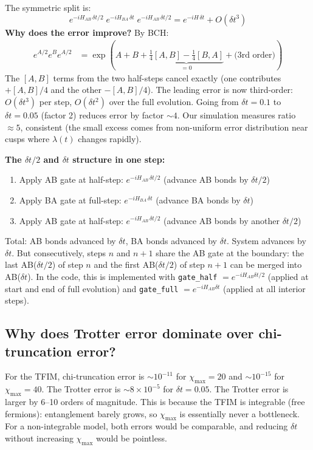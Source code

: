\documentclass[11pt, a4paper]{article}
\begin{document}
The symmetric split is:
\begin{equation}
  e^{-iH_{AB}\,\delta t/2}\; e^{-iH_{BA}\,\delta t}\; e^{-iH_{AB}\,\delta t/2} = e^{-iH\,\delta t} + O(\delta t^3)
\end{equation}
\textbf{Why does the error improve?} By BCH:
\begin{align}
  e^{A/2} e^{B} e^{A/2} &= \exp\!\left(A + B + \underbrace{\tfrac{1}{4}[A,B] - \tfrac{1}{4}[B,A]}_{=0} + \text{(3rd order)} \right)
\end{align}
The $[A,B]$ terms from the two half-steps cancel exactly (one contributes $+[A,B]/4$ and the other $-[A,B]/4$). The leading error is now third-order: $O(\delta t^3)$ per step, $O(\delta t^2)$ over the full evolution. Going from $\delta t = 0.1$ to $\delta t = 0.05$ (factor 2) reduces error by factor $\sim 4$. Our simulation measures ratio $\approx 5$, consistent (the small excess comes from non-uniform error distribution near cusps where $\lambda(t)$ changes rapidly).

\textbf{The $\delta t/2$ and $\delta t$ structure in one step:}
\begin{enumerate}
  \item Apply AB gate at half-step: $e^{-iH_{AB}\,\delta t/2}$ \quad (advance AB bonds by $\delta t/2$)
  \item Apply BA gate at full-step: $e^{-iH_{BA}\,\delta t}$ \quad (advance BA bonds by $\delta t$)
  \item Apply AB gate at half-step: $e^{-iH_{AB}\,\delta t/2}$ \quad (advance AB bonds by another $\delta t/2$)
\end{enumerate}
Total: AB bonds advanced by $\delta t$, BA bonds advanced by $\delta t$. System advances by $\delta t$. But consecutively, steps $n$ and $n+1$ share the AB gate at the boundary: the last AB($\delta t/2$) of step $n$ and the first AB($\delta t/2$) of step $n+1$ can be merged into AB($\delta t$). In the code, this is implemented with \texttt{gate\_half} $= e^{-iH_{AB}\delta t/2}$ (applied at start and end of full evolution) and \texttt{gate\_full} $= e^{-iH_{AB}\delta t}$ (applied at all interior steps).

\subsection{Why does Trotter error dominate over chi-truncation error?}

For the TFIM, chi-truncation error is $\sim 10^{-11}$ for $\chi_{\max} = 20$ and $\sim 10^{-15}$ for $\chi_{\max} = 40$. The Trotter error is $\sim 8 \times 10^{-5}$ for $\delta t = 0.05$. The Trotter error is larger by 6--10 orders of magnitude. This is because the TFIM is integrable (free fermions): entanglement barely grows, so $\chi_{\max}$ is essentially never a bottleneck. For a non-integrable model, both errors would be comparable, and reducing $\delta t$ without increasing $\chi_{\max}$ would be pointless.
\end{document}

